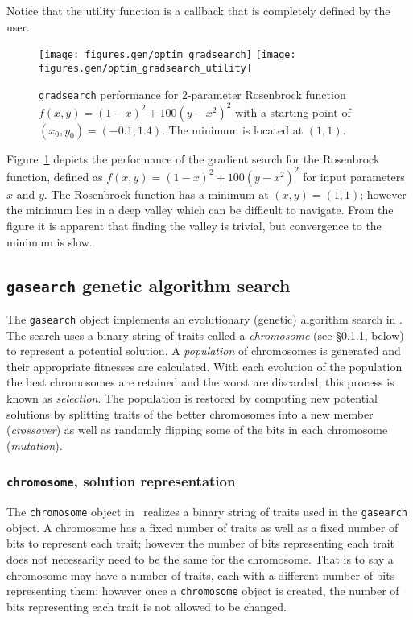 
%
Notice that the utility function is a callback that is completely
defined by the user.
%
\begin{figure}
\centering
  \texttt{[image: figures.gen/optim\_gradsearch]}
  \texttt{[image: figures.gen/optim\_gradsearch\_utility]}
\caption{
    {\tt gradsearch} performance for 2-parameter Rosenbrock function
    $f(x,y) = (1-x)^2 + 100(y-x^2)^2$
    with a starting point of $(x_0,y_0)=(-0.1,1.4)$.
    The minimum is located at $(1,1)$.}
\label{fig:module:optim:gradsearch}
\end{figure}
%
Figure~\ref{fig:module:optim:gradsearch} depicts the performance of the
gradient search for the Rosenbrock function, defined as
$f(x,y) = (1-x)^2 + 100(y-x^2)^2$ for input parameters $x$ and $y$.
The Rosenbrock function has a minimum at $(x,y)=(1,1)$;
however the minimum lies in a deep valley which can be difficult to
navigate.
From the figure it is apparent that finding the valley is trivial,
but convergence to the minimum is slow.


\subsection{{\tt gasearch} genetic algorithm search}
\label{module:optim:gasearch}

The {\tt gasearch} object implements an evolutionary (genetic)
algorithm search in \liquid.
The search uses a binary string of traits called a {\em chromosome}
(see \S\ref{module:optim:gasearch:chromosome}, below)
to represent a potential solution.
A {\em population} of chromosomes is generated and their appropriate
fitnesses are calculated.
With each evolution of the population the best chromosomes are retained
and the worst are discarded; this process is known as {\em selection}.
The population is restored by computing new potential solutions by
splitting traits of the better chromosomes into a new member
({\em crossover}) as well as randomly flipping some of the bits in each
chromosome ({\em mutation}).

\subsubsection{{\tt chromosome}, solution representation}
\label{module:optim:gasearch:chromosome}
The {\tt chromosome} object in \liquid\ realizes a binary string of
traits used in the {\tt gasearch} object.
A chromosome has a fixed number of traits as well as a fixed number of
bits to represent each trait;
however the number of bits representing each trait does not necessarily
need to be the same for the chromosome.
That is to say a chromosome may have a number of traits, each with a
different number of bits representing them;
however once a {\tt chromosome} object is created, the number of bits
representing each trait is not allowed to be changed.

